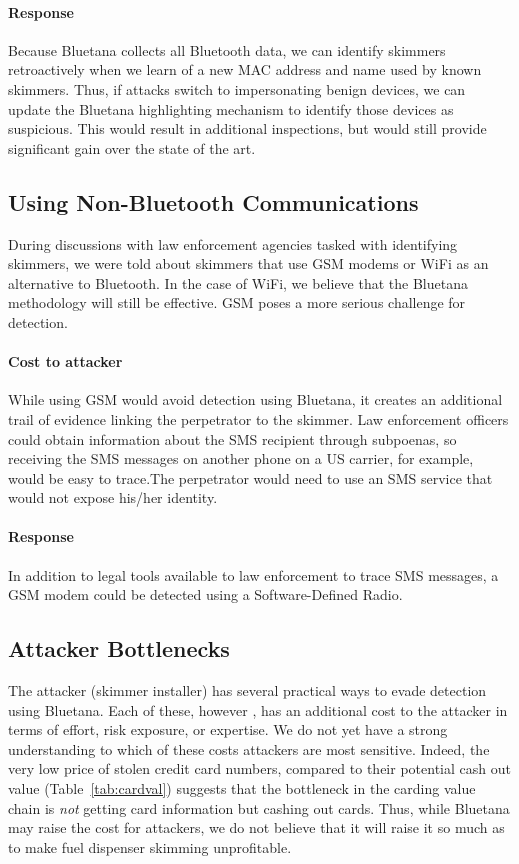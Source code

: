 \paragraph{Response} Because Bluetana collects all Bluetooth data, we can identify skimmers retroactively when we
learn of a new MAC address and name used by known skimmers. Thus, if attacks switch to impersonating benign devices,
we can update the Bluetana highlighting mechanism to identify those devices as suspicious. This would result in
additional inspections, but would still provide significant gain over the state of the art.

\subsection{Using Non-Bluetooth Communications}
During discussions with law enforcement agencies tasked with identifying skimmers, we were told about skimmers that
use GSM modems or WiFi as an alternative to Bluetooth. In the case of WiFi, we believe that the Bluetana methodology
will still be effective. GSM poses a more serious challenge for detection.

\paragraph{Cost to attacker}
While using GSM would avoid detection using Bluetana, it creates an additional trail of evidence linking the
perpetrator to the skimmer. Law enforcement officers could obtain information about the SMS recipient through
subpoenas, so receiving the SMS messages on another phone on a US carrier, for example, would be easy to trace.The
perpetrator would need to use an SMS service that would not expose his/her identity.

\paragraph{Response} In addition to legal tools available to law enforcement to trace SMS messages, a GSM modem could
be detected using a Software-Defined Radio.%

\subsection{Attacker Bottlenecks}
The attacker (skimmer installer) has several practical ways to evade detection using Bluetana. Each of these, however
, has an additional cost to the attacker in terms of effort, risk exposure, or expertise. We do not yet have a strong
understanding to which of these costs attackers are most sensitive. Indeed, the very low price of stolen credit card
numbers, compared to their potential cash out value (Table~\ref{tab:cardval}) suggests that the bottleneck in the
carding value chain is \emph{not} getting card information but cashing out cards. Thus, while Bluetana may raise the
cost for attackers, we do not believe that it will raise it so much as to make fuel dispenser skimming unprofitable.
